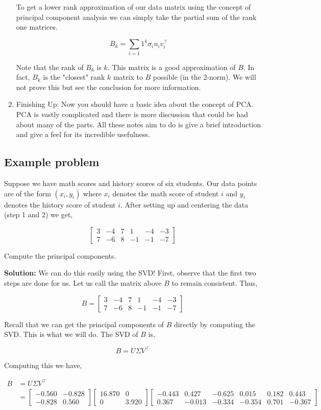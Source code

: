 \documentclass{article}
\begin{document}
\begin{enumerate}
To get a lower rank approximation of our data matrix using the concept of principal component analysis we can simply take the partial sum of the rank one matrices.

$$B_k=\sum_{i=1}1^k\sigma_iu_iv^\top_i$$

Note that the rank of $B_k$ is $k$. This matrix is a good approximation of $B$. In fact, $B_k$ is the "closest" rank $k$ matrix to $B$ possible (in the 2-norm). We will not prove this but see the conclusion for more information.

\item Finishing Up: Now you should have a basic idea about the concept of PCA. PCA is vastly complicated and there is more discussion that could be had about many of the parts. All these notes aim to do is give a brief introduction and give a feel for its incredible usefulness. 
\end{enumerate}

\subsection{Example problem}
Suppose we have math scores and history scores of six students. Our data points are of the form $(x_i,y_i)$ where $x_i$ denotes the math score of student $i$ and $y_i$ denotes the
history score of student $i$. After setting up and centering the data (step 1 and 2) we get,

$$\begin{bmatrix}
3& -4& 7& 1& -4& -3\\
7& -6& 8& -1& -1& -7
\end{bmatrix}$$

\noindent Compute the principal components.

\bigskip

\textbf{Solution:} We can do this easily using the SVD! First, observe that the first two steps are done for us. Let us call the matrix above $B$ to remain consistent. Thus,

$$B=\begin{bmatrix}
3&-4&7&1&-4&-3\\
7&-6&8&-1&-1&-7
\end{bmatrix}$$

Recall that we can get the principal components of $B$ directly by computing the SVD. This is what we will do. The SVD of $B$ is,

$$B=U\Sigma V^\top$$

Computing this we have,

\begin{align}
B&=U\Sigma V^\top\\
&=\begin{bmatrix}
-0.560&-0.828\\
-0.828&0.560\end{bmatrix}
\begin{bmatrix}
16.870&0\\
0&3.920
\end{bmatrix}
\begin{bmatrix}-0.443&0.427&-0.625&0.015&0.182&0.443\\
0.367&-0.013&-0.334&-0.354&0.701&-0.367\end{bmatrix}
\end{align}
\end{document}
